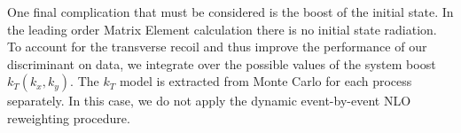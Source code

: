 

One final complication that must be considered is the boost of the initial state.
In the leading order Matrix Element calculation there is no initial state radiation. 
To account for the transverse recoil and thus improve the performance of our discriminant
on data, we integrate over the possible values of the system boost $k_{T}(k_{x},k_{y})$. 
The $k_T$ model is extracted from Monte Carlo for each process separately. 
In this case, we do not apply the dynamic event-by-event NLO reweighting procedure. 




